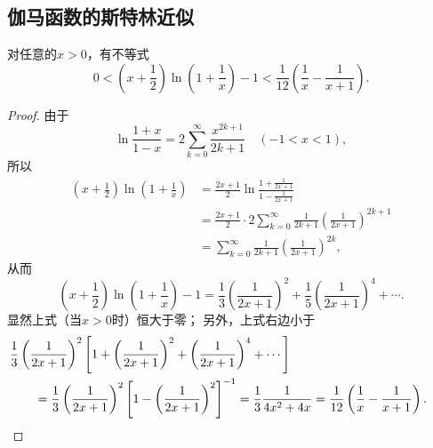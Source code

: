 \subsection{伽马函数的斯特林近似}
\begin{lemma}\label{theorem:定积分.伽马函数的斯特灵近似.引理1}
对任意的\(x>0\)，有不等式\begin{equation}\label{equation:定积分.伽马函数的斯特灵近似.引理1}
	0 < \left(x+\frac{1}{2}\right) \ln(1+\frac{1}{x}) - 1
	< \frac{1}{12}\left(\frac{1}{x}-\frac{1}{x+1}\right).
\end{equation}
\begin{proof}
由于\[
	\ln\frac{1+x}{1-x}
	= 2 \sum_{k=0}^\infty \frac{x^{2k+1}}{2k+1}
	\quad(-1<x<1),
\]
所以\begin{align*}
	\left(x+\frac{1}{2}\right) \ln(1+\frac{1}{x})
	&= \frac{2x+1}{2} \ln\frac{
		1+\frac{1}{2x+1}
	}{
		1-\frac{1}{2x+1}
	} \\
	&= \frac{2x+1}{2} \cdot
	2 \sum_{k=0}^\infty \frac{1}{2k+1} \left(\frac{1}{2x+1}\right)^{2k+1} \\
	&= \sum_{k=0}^\infty \frac{1}{2k+1} \left(\frac{1}{2x+1}\right)^{2k},
\end{align*}
从而\[
	\left(x+\frac{1}{2}\right) \ln(1+\frac{1}{x}) - 1
	= \frac{1}{3} \left(\frac{1}{2x+1}\right)^2
	+ \frac{1}{5} \left(\frac{1}{2x+1}\right)^4
	+ \dotsb.
\]
显然上式（当\(x>0\)时）恒大于零；
另外，上式右边小于\begin{align*}
	&\hspace{-20pt}
	\frac{1}{3} \left(\frac{1}{2x+1}\right)^2 \left[
	1 + \left(\frac{1}{2x+1}\right)^2 + \left(\frac{1}{2x+1}\right)^4 + \dotsb
	\right] \\
	&= \frac{1}{3} \left(\frac{1}{2x+1}\right)^2 \left[
	1 - \left(\frac{1}{2x+1}\right)^2
	\right]^{-1}
	= \frac{1}{3} \frac{1}{4x^2 + 4x}
	= \frac{1}{12} \left(\frac{1}{x} - \frac{1}{x+1}\right).
	\qedhere
\end{align*}
\end{proof}
\end{lemma}


